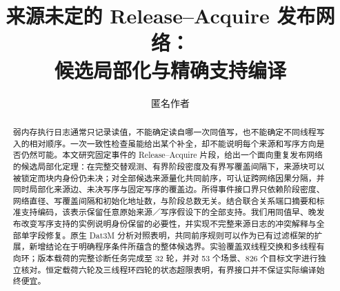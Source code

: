 \documentclass[runningheads]{llncs}
\begin{document}
\raggedbottom
\title{来源未定的 Release--Acquire 发布网络：\\候选局部化与精确支持编译}
\author{匿名作者}
\maketitle
\begin{abstract}
弱内存执行日志通常只记录读值，不能确定读自哪一次同值写，也不能确定不同线程写入的相对顺序。一次一致性检查虽能给出某个补全，却不能说明每个来源和写序方向是否仍然可能。本文研究固定事件的 Release--Acquire 片段，给出一个面向重复发布网络的候选局部化定理：在完整交替观测、有界阶段密度及有界写覆盖间隔下，来源块可以被锁定而块内身份仍未决；对全部候选来源量化共同前序，可认证跨网络因果分隔，并同时局部化来源边、未决写序与固定写序的覆盖边。所得事件接口界只依赖阶段密度、网络直径、写覆盖间隔和初始化地址数，与阶段总数无关。结合联合关系端口摘要和标准支持编码，该表示保留任意原始来源／写序假设下的全部支持。我们用同值早、晚发布改变写序支持的实例说明身份保留的必要性，并实现不完整来源日志的冲突解释与全部单字段修复。原生 Dat3M 分析对照表明，共同前序规则可以作为已有过滤框架的扩展，新增结论在于明确程序条件所蕴含的整体候选界。实验覆盖双线程交换和多线程有向环；版本载荷的完整诊断任务完成至 32 轮，并对 53 个场景、826 个目标文字进行独立核对。恒定载荷六轮及三线程环四轮的状态超限表明，有界接口并不保证实际编译始终便宜。
\end{abstract}









\clearpage
\appendix

\end{document}
